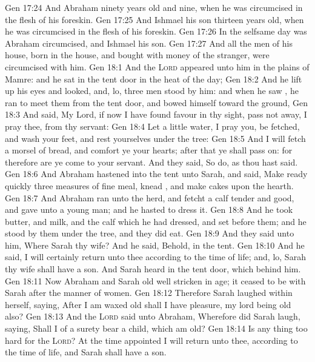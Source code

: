 \vs Gen 17:24 And Abraham  ninety years old and nine, when he was circumcised in the flesh of his foreskin.
\vs Gen 17:25 And Ishmael his son  thirteen years old, when he was circumcised in the flesh of his foreskin.
\vs Gen 17:26 In the selfsame day was Abraham circumcised, and Ishmael his son.
\vs Gen 17:27 And all the men of his house, born in the house, and bought with money of the stranger, were circumcised with him.
\vs Gen 18:1 And the \textsc{Lord} appeared unto him in the plains of Mamre: and he sat in the tent door in the heat of the day;
\vs Gen 18:2 And he lift up his eyes and looked, and, lo, three men stood by him: and when he saw , he ran to meet them from the tent door, and bowed himself toward the ground,
\vs Gen 18:3 And said, My Lord, if now I have found favour in thy sight, pass not away, I pray thee, from thy servant:
\vs Gen 18:4 Let a little water, I pray you, be fetched, and wash your feet, and rest yourselves under the tree:
\vs Gen 18:5 And I will fetch a morsel of bread, and comfort ye your hearts; after that ye shall pass on: for therefore are ye come to your servant. And they said, So do, as thou hast said.
\vs Gen 18:6 And Abraham hastened into the tent unto Sarah, and said, Make ready quickly three measures of fine meal, knead , and make cakes upon the hearth.
\vs Gen 18:7 And Abraham ran unto the herd, and fetcht a calf tender and good, and gave  unto a young man; and he hasted to dress it.
\vs Gen 18:8 And he took butter, and milk, and the calf which he had dressed, and set  before them; and he stood by them under the tree, and they did eat.
\vs Gen 18:9 And they said unto him, Where  Sarah thy wife? And he said, Behold, in the tent.
\vs Gen 18:10 And he said, I will certainly return unto thee according to the time of life; and, lo, Sarah thy wife shall have a son. And Sarah heard  in the tent door, which  behind him.
\vs Gen 18:11 Now Abraham and Sarah  old  well stricken in age;  it ceased to be with Sarah after the manner of women.
\vs Gen 18:12 Therefore Sarah laughed within herself, saying, After I am waxed old shall I have pleasure, my lord being old also?
\vs Gen 18:13 And the \textsc{Lord} said unto Abraham, Wherefore did Sarah laugh, saying, Shall I of a surety bear a child, which am old?
\vs Gen 18:14 Is any thing too hard for the \textsc{Lord}? At the time appointed I will return unto thee, according to the time of life, and Sarah shall have a son.
